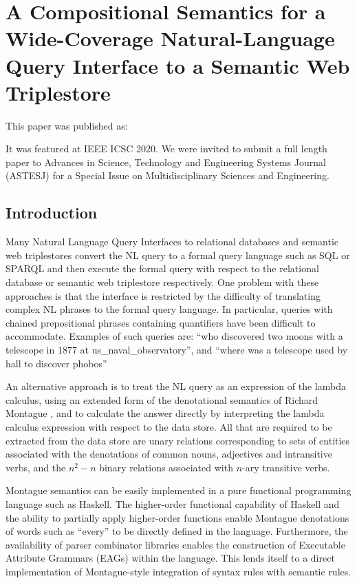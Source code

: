 \documentclass[../main.tex]{subfiles}
\begin{document}
\chapter{A Compositional Semantics for a Wide-Coverage Natural-Language Query Interface to a Semantic Web Triplestore}
\begin{refsection}

This paper was published as:


It was featured at IEEE ICSC 2020.  We were invited to submit a full length paper to Advances in Science, Technology and Engineering Systems Journal (ASTESJ) for a Special Issue on Multidisciplinary Sciences and Engineering.

\label{chapter:icsc2020conf}


\section{Introduction}

Many Natural Language Query Interfaces to relational databases and semantic web triplestores
convert the NL query to a formal query language such as SQL or SPARQL and then execute the formal
query with respect to the relational database or semantic web triplestore respectively. One problem with
these approaches is that the interface is restricted by the difficulty of translating complex NL phrases to
the formal query language. In particular, queries with chained prepositional phrases containing
quantifiers have been difficult to accommodate. Examples of such queries are: ``who discovered two
moons with a telescope in 1877 at us\_naval\_observatory'', and ``where was a telescope used by hall to discover phobos''

An alternative approach is to treat the NL query as an expression of the lambda calculus, using an
extended form of the denotational semantics of Richard Montague \cite{Dowty:wall}, and to calculate the answer directly
by interpreting the lambda calculus expression with respect to the data store. All that are required to be
extracted from the data store are unary relations corresponding to sets of entities associated with the
denotations of common nouns, adjectives and intransitive verbs, and the $n^2 - n$ binary relations
associated with $n$-ary transitive verbs.

Montague semantics can be easily implemented in a pure functional programming language such as
Haskell. The higher-order functional capability of Haskell and the ability to partially apply higher-order functions enable Montague denotations of words such as ``every'' to be directly defined in the language. Furthermore, the availability of
parser combinator libraries enables the construction of Executable Attribute Grammars (EAGs) within the language.
This lends itself to a direct implementation of Montague-style integration of syntax rules with semantic rules.


\end{refsection}
\end{document}
